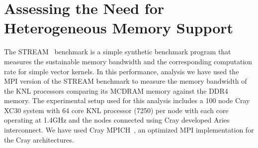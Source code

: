 \section{Assessing the Need for Heterogeneous Memory Support}
\label{src:drelated}

The STREAM~\cite{stream} benchmark is a simple synthetic benchmark
program that measures the sustainable memory bandwidth and the
corresponding computation rate for simple vector kernels. In this
performance, analysis we have used the MPI version of the STREAM
benchmark to measure the memory bandwidth of the KNL processors
comparing its MCDRAM memory against the DDR4 memory. The experimental
setup used for this analysis includes a 100 node Cray XC30 system
with 64 core KNL processor (7250) per node with each core operating
at 1.4GHz and the nodes connected using Cray developed
Aries~\cite{aries} interconnect. We have used Cray MPICH~\cite{mpt},
an optimized MPI implementation for the Cray architectures.

